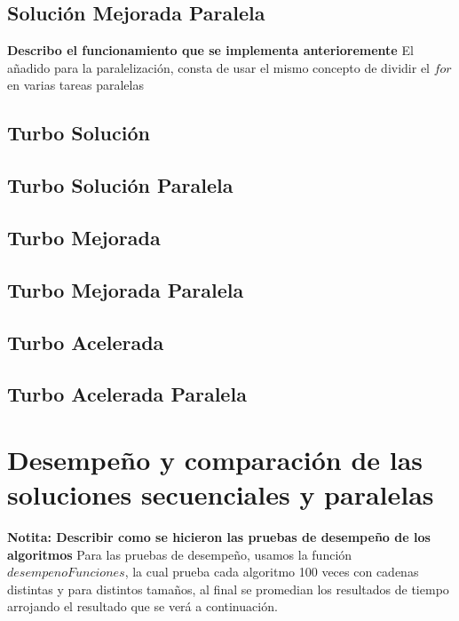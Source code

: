 \documentclass[conference]{IEEEtran}
\begin{document}
\subsection{\textbf{Solución Mejorada Paralela}}

\textbf{Describo el funcionamiento que se implementa anterioremente}
El añadido para la paralelización, consta de usar el mismo concepto de dividir el $for$ en varias tareas paralelas

\subsection{\textbf{Turbo Solución}}

\subsection{\textbf{Turbo Solución Paralela}}

\subsection{\textbf{Turbo Mejorada}}

\subsection{\textbf{Turbo Mejorada Paralela}}

\subsection{\textbf{Turbo Acelerada}}

\subsection{\textbf{Turbo Acelerada Paralela}}



\section{\textbf{Desempeño  y comparación de las soluciones secuenciales y paralelas} }

\textbf{Notita: Describir como se hicieron las pruebas de desempeño de los algoritmos}
Para las pruebas de desempeño, usamos la función $desempenoFunciones$, la cual prueba cada algoritmo 100 veces con cadenas distintas y para distintos tamaños, al final se promedian los resultados de tiempo
arrojando el resultado que se verá a continuación.
\end{document}

